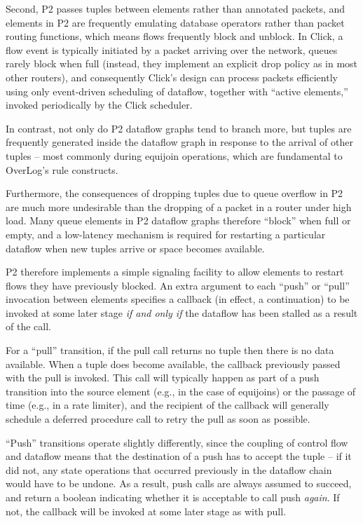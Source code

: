 \documentclass{sig-alt-full}
\def\Sys{P2\xspace}
\def\Lang{OverLog\xspace}
\begin{document}
Second, \Sys passes tuples between elements rather than annotated
packets, and elements in \Sys are frequently emulating database operators
rather than packet routing functions, which means flows frequently
block and unblock.  In Click, a flow event is typically
initiated by a packet arriving over the network, queues rarely block
when full (instead, they implement an explicit drop policy as in most
other routers), and consequently Click's design can process packets
efficiently using only event-driven scheduling of dataflow, together
with ``active elements,'' invoked periodically by the Click scheduler. 

In contrast, not only do \Sys dataflow graphs 
tend to branch more, but tuples are frequently generated inside the
dataflow graph in response to the arrival of other tuples -- most
commonly during equijoin operations, which are fundamental to \Lang's rule
constructs. 

Furthermore, the consequences of dropping tuples due to queue overflow
in \Sys are much more undesirable than the dropping of a
packet in a router under high load.  Many queue elements in \Sys
dataflow graphs therefore 
``block'' when full or empty, and a low-latency mechanism is required
for restarting a particular dataflow when new tuples arrive or space
becomes available.  

\Sys therefore implements a simple signaling facility to allow
elements to restart flows they have previously blocked.  An extra
argument to each ``push'' or ``pull'' invocation between elements
specifies a callback (in effect, a continuation) to be invoked at some
later stage \emph{if and only if} the dataflow has been stalled as a
result of the call.  

For a ``pull'' transition, if the pull
call returns no tuple then there is no data available.  When a tuple
does become available, the callback previously passed with the pull is
invoked.  This call will typically happen as part of a push transition
into the source element (e.g., in the case of equijoins) or the passage of
time (e.g., in a rate limiter), and the recipient of the callback will
generally schedule a deferred procedure call to retry the pull as soon
as possible.  

``Push'' transitions operate slightly differently, since the coupling
of control flow and dataflow means that the destination of a push has to
accept the tuple -- if it did not, any state operations that occurred
previously in the dataflow chain would have to be undone.  As a
result, push calls are always assumed to succeed, and return a boolean indicating whether it is
acceptable to call push {\em again}.  If not, the callback will be invoked
at some later stage as with pull. 
\end{document}
